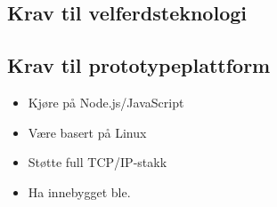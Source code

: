 \subsection{Krav til velferdsteknologi}
\subsection{Krav til prototypeplattform}

\begin{itemize}
    \item Kjøre på Node.js/JavaScript
    \item Være basert på Linux
    \item Støtte full TCP/IP-stakk
    \item Ha innebygget \gls{ble}.
\end{itemize}



